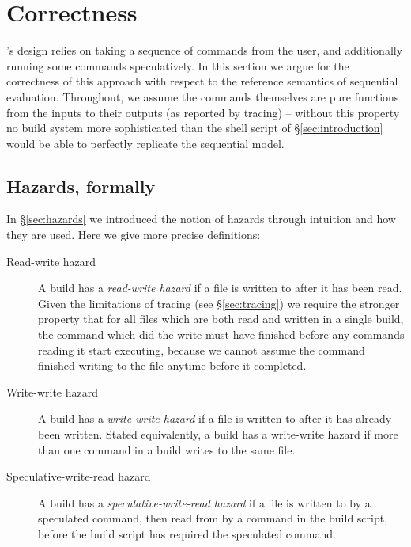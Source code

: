 
\renewcommand{\proof}{\vspace{1mm}\noindent \textbf{Proof}: }
\newcommand{\refutation}{\vspace{1mm}\noindent \textbf{Refutation}: }

\section{Correctness}
\label{sec:proof}

\newtheorem{claim}{Claim}

\Rattle's design relies on taking a sequence of commands from the user, and additionally running some commands speculatively. In this section we argue for the correctness of this approach with respect to the reference semantics of sequential evaluation. Throughout, we assume the commands themselves are pure functions from the inputs to their outputs (as reported by tracing) -- without this property no build system more sophisticated than the shell script of \S\ref{sec:introduction} would be able to perfectly replicate the sequential model.

\subsection{Hazards, formally}
\label{sec:hazards_formally}

In \S\ref{sec:hazards} we introduced the notion of hazards through
intuition and how they are used. Here we give more precise
definitions:

\begin{description}
\item[Read-write hazard] A build has a \emph{read-write hazard} if a file is written to after it has been read. Given the limitations of tracing (see \S\ref{sec:tracing}) we require the stronger property that for all files which are both read and written in a single build, the command which did the write must have finished before any commands reading it start executing, because we cannot assume the command finished writing to the file anytime before it completed.  %
\item[Write-write hazard] A build has a \emph{write-write hazard} if a file is written to after it has already been written. Stated equivalently, a build has a write-write hazard if more than one command in a build writes to the same file.
\item[Speculative-write-read hazard] A build has a \emph{speculative-write-read hazard} if a file is written to by a speculated command, then read from by a command in the build script, before the build script has required the speculated command.
\end{description}

